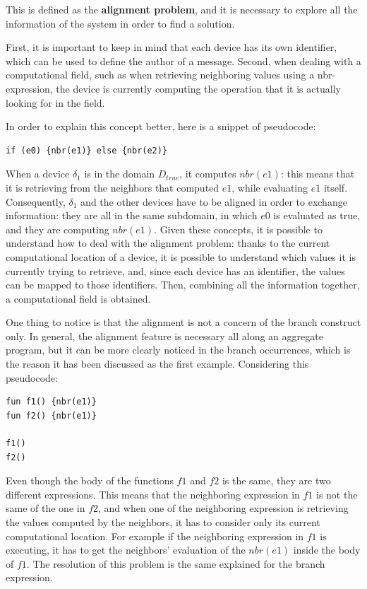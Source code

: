 This is defined as the \textbf{alignment problem}, and it is necessary to explore all the information of the system in order to find a solution.

First, it is important to keep in mind that each device has its own identifier, which can be used to define the author of a message.\newline
Second, when dealing with a computational field, such as when retrieving neighboring values using a nbr-expression, the device is currently computing the operation that it is actually looking for in the field.

In order to explain this concept better, here is a snippet of pseudocode:
\begin{lstlisting}
if (e0) {nbr(e1)} else {nbr(e2)}
\end{lstlisting}
When a device $\delta_1$ is in the domain $D_{true}$, it computes $nbr(e1)$: this means that it is retrieving from the neighbors that computed $e1$, while evaluating $e1$ itself.\newline
Consequently, $\delta_1$ and the other devices have to be aligned in order to exchange information: they are all in the same subdomain, in which $e0$ is evaluated as true, and they are computing $nbr(e1)$.\newline
Given these concepts, it is possible to understand how to deal with the alignment problem: thanks to the current computational location of a device, it is possible to understand which values it is currently trying to retrieve, and, since each device has an identifier, the values can be mapped to those identifiers. Then, combining all the information together, a computational field is obtained.

One thing to notice is that the alignment is not a concern of the branch construct only. In general, the alignment feature is necessary all along an aggregate program, but it can be more clearly noticed in the branch occurrences, which is the reason it has been discussed as the first example.\newline
Considering this pseudocode:
\begin{lstlisting}
fun f1() {nbr(e1)}
fun f2() {nbr(e1)}

f1()
f2()
\end{lstlisting}
Even though the body of the functions $f1$ and $f2$ is the same, they are two different expressions. This means that the neighboring expression in $f1$ is not the same of the one in $f2$, and when one of the neighboring expression is retrieving the values computed by the neighbors, it has to consider only its current computational location. For example if the neighboring expression in $f1$ is executing, it has to get the neighbors' evaluation of the $nbr(e1)$ inside the body of $f1$. The resolution of this problem is the same explained for the branch expression.

